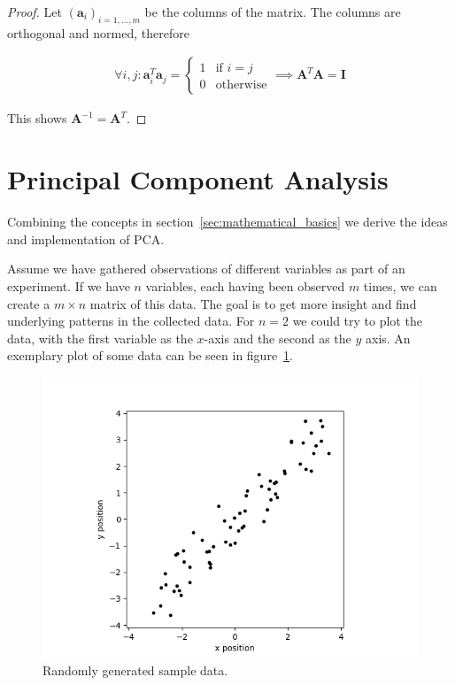 \documentclass[a4paper]{IEEEtran}
\begin{document}
\begin{proof}
	Let $(\mathbf{a}_i)_{i=1,...,m}$ be the columns of the matrix. The columns are orthogonal and normed, therefore
	
	\begin{align*}
		\forall i,j: \mathbf{a}_i^T\mathbf{a}_j = \begin{cases}
			1 & \text{if } i=j\\
			0 & \text{otherwise}
		\end{cases} \implies \mathbf{A}^T\mathbf{A} = \mathbf{I}
	\end{align*}
	
	This shows $\mathbf{A}^{-1} = \mathbf{A}^T$.
\end{proof}

\section{Principal Component Analysis}
\label{sec:principal_component_analysis}

Combining the concepts in section~\ref{sec:mathematical_basics} we derive the ideas and implementation of PCA.

Assume we have gathered observations of different variables as part of an experiment. If we have $n$ variables, each having been observed $m$ times, we can create a $m \times n$ matrix of this data. The goal is to get more insight and find underlying patterns in the collected data. For $n = 2$ we could try to plot the data, with the first variable as the $x$-axis and the second as the $y$ axis. An exemplary plot of some data can be seen in figure~\ref{fig:some_nice_data}.

\begin{figure}
	\centering
	\includegraphics[width=\linewidth]{figs/some_nice_data_org}
	\caption{Randomly generated sample data.}
	\label{fig:some_nice_data}
\end{figure}
\end{document}
